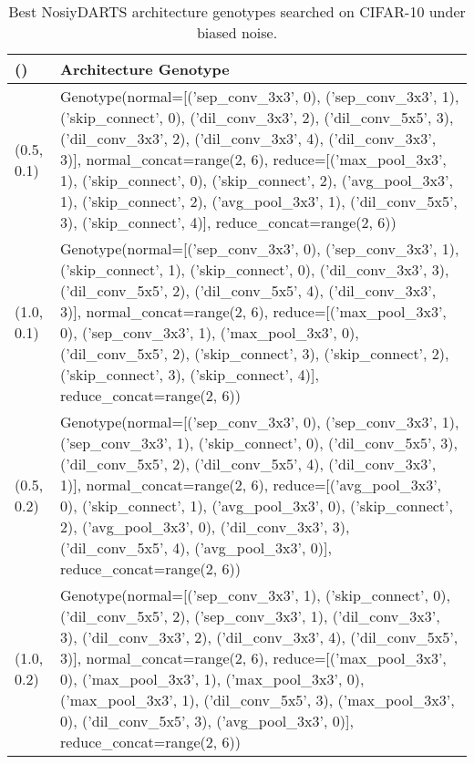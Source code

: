 \documentclass{article}
\begin{document}
\begin{table}[ht]
	\begin{center}
		\caption{Best NosiyDARTS architecture genotypes searched on CIFAR-10 under biased noise.}
		\label{table:genotypes-baised-noise}
		\begin{tabular}{lp{330pt}}
			\toprule
			() &  Architecture Genotype \\
			\midrule
			(0.5, 0.1) &  Genotype(normal=[('sep\_conv\_3x3', 0), ('sep\_conv\_3x3', 1), ('skip\_connect', 0), ('dil\_conv\_3x3', 2), ('dil\_conv\_5x5', 3), ('dil\_conv\_3x3', 2), ('dil\_conv\_3x3', 4), ('dil\_conv\_3x3', 3)], normal\_concat=range(2, 6), reduce=[('max\_pool\_3x3', 1), ('skip\_connect', 0), ('skip\_connect', 2), ('avg\_pool\_3x3', 1), ('skip\_connect', 2), ('avg\_pool\_3x3', 1), ('dil\_conv\_5x5', 3), ('skip\_connect', 4)], reduce\_concat=range(2, 6)) \\ (1.0, 0.1) &   Genotype(normal=[('sep\_conv\_3x3', 0), ('sep\_conv\_3x3', 1), ('skip\_connect', 1), ('skip\_connect', 0), ('dil\_conv\_3x3', 3), ('dil\_conv\_5x5', 2), ('dil\_conv\_5x5', 4), ('dil\_conv\_3x3', 3)], normal\_concat=range(2, 6), reduce=[('max\_pool\_3x3', 0), ('sep\_conv\_3x3', 1), ('max\_pool\_3x3', 0), ('dil\_conv\_5x5', 2), ('skip\_connect', 3), ('skip\_connect', 2), ('skip\_connect', 3), ('skip\_connect', 4)], reduce\_concat=range(2, 6)) \\ (0.5, 0.2) &  Genotype(normal=[('sep\_conv\_3x3', 0), ('sep\_conv\_3x3', 1), ('sep\_conv\_3x3', 1), ('skip\_connect', 0), ('dil\_conv\_5x5', 3), ('dil\_conv\_5x5', 2), ('dil\_conv\_5x5', 4), ('dil\_conv\_3x3', 1)], normal\_concat=range(2, 6), reduce=[('avg\_pool\_3x3', 0), ('skip\_connect', 1), ('avg\_pool\_3x3', 0), ('skip\_connect', 2), ('avg\_pool\_3x3', 0), ('dil\_conv\_3x3', 3), ('dil\_conv\_5x5', 4), ('avg\_pool\_3x3', 0)], reduce\_concat=range(2, 6)) \\ (1.0, 0.2) &  Genotype(normal=[('sep\_conv\_3x3', 1), ('skip\_connect', 0), ('dil\_conv\_5x5', 2), ('sep\_conv\_3x3', 1), ('dil\_conv\_3x3', 3), ('dil\_conv\_3x3', 2), ('dil\_conv\_3x3', 4), ('dil\_conv\_5x5', 3)], normal\_concat=range(2, 6), reduce=[('max\_pool\_3x3', 0), ('max\_pool\_3x3', 1), ('max\_pool\_3x3', 0), ('max\_pool\_3x3', 1), ('dil\_conv\_5x5', 3), ('max\_pool\_3x3', 0), ('dil\_conv\_5x5', 3), ('avg\_pool\_3x3', 0)], reduce\_concat=range(2, 6)) \\ \bottomrule
		\end{tabular}
	\end{center}
\end{table}
\end{document}
